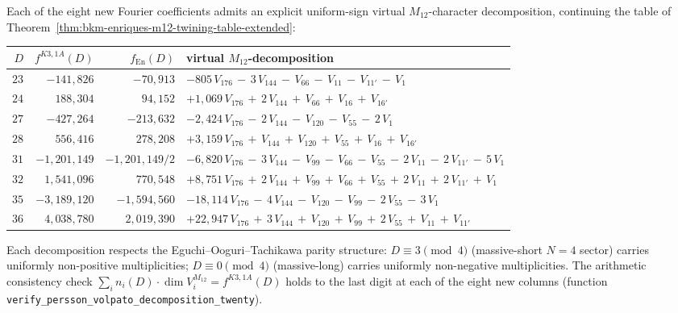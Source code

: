 \begin{theorem}
Each of the eight new Fourier coefficients admits an explicit uniform-sign
virtual $M_{12}$-character decomposition, continuing the table of
Theorem~\textup{\ref{thm:bkm-enriques-m12-twining-table-extended}}:
\begin{center}
\renewcommand{\arraystretch}{1.12}
\begin{tabular}{r|r|r|l}
\toprule
$D$ & $f^{K3,1A}(D)$ & $f_{\mathrm{En}}(D)$
 & virtual $M_{12}$-decomposition \\
\midrule
$23$ & $-141{,}826$ & $-70{,}913$ & $-805\,V_{176}\,-\,3\,V_{144}\,-\,V_{66}\,-\,V_{11}\,-\,V_{11'}\,-\,V_1$ \\
$24$ & $188{,}304$ & $94{,}152$ & $+1{,}069\,V_{176}\,+\,2\,V_{144}\,+\,V_{66}\,+\,V_{16}\,+\,V_{16'}$ \\
$27$ & $-427{,}264$ & $-213{,}632$ & $-2{,}424\,V_{176}\,-\,2\,V_{144}\,-\,V_{120}\,-\,V_{55}\,-\,2\,V_1$ \\
$28$ & $556{,}416$ & $278{,}208$ & $+3{,}159\,V_{176}\,+\,V_{144}\,+\,V_{120}\,+\,V_{55}\,+\,V_{16}\,+\,V_{16'}$ \\
$31$ & $-1{,}201{,}149$& $-1{,}201{,}149/2$ & $-6{,}820\,V_{176}\,-\,3\,V_{144}\,-\,V_{99}\,-\,V_{66}\,-\,V_{55}\,-\,2\,V_{11}\,-\,2\,V_{11'}\,-\,5\,V_1$ \\
$32$ & $1{,}541{,}096$ & $770{,}548$ & $+8{,}751\,V_{176}\,+\,2\,V_{144}\,+\,V_{99}\,+\,V_{66}\,+\,V_{55}\,+\,2\,V_{11}\,+\,2\,V_{11'}\,+\,V_1$ \\
$35$ & $-3{,}189{,}120$& $-1{,}594{,}560$ & $-18{,}114\,V_{176}\,-\,4\,V_{144}\,-\,V_{120}\,-\,V_{99}\,-\,2\,V_{55}\,-\,3\,V_1$ \\
$36$ & $4{,}038{,}780$ & $2{,}019{,}390$ & $+22{,}947\,V_{176}\,+\,3\,V_{144}\,+\,V_{120}\,+\,V_{99}\,+\,2\,V_{55}\,+\,V_{11}\,+\,V_{11'}$ \\
\bottomrule
\end{tabular}
\end{center}
Each decomposition respects the Eguchi--Ooguri--Tachikawa parity
structure: $D\equiv 3\pmod 4$ (massive-short $N = 4$ sector) carries
uniformly non-positive multiplicities; $D\equiv 0\pmod 4$ (massive-long)
carries uniformly non-negative multiplicities. The arithmetic
consistency check
$\sum_i n_i(D)\cdot\dim V_i^{M_{12}} = f^{K3,1A}(D)$ holds to the last
digit at each of the eight new columns
\textup{(}function
\texttt{verify\_persson\_volpato\_decomposition\_twenty}\textup{)}.


\end{theorem}
